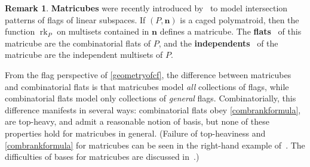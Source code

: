 \documentclass[11pt]{article}
\theoremstyle{definition}
\newtheorem{rema}[theo]{Remark}
\numberwithin{equation}{section}
\DeclareMathOperator{\rk}{rk}
\newcommand{\word}[1]{\textbf{#1}}
\begin{document}
\begin{rema}
  \label{matricube}
  \word{Matricubes} were recently introduced by~\cite{AG24} to model intersection patterns of flags of linear subspaces.
  If $(P, \mathbf n)$ is a caged polymatroid, then the function $\rk_P$ on multisets contained in $\mathbf n$ defines a matricube.
  The \word{flats}~\cite[Definition 3.1]{AG24} of this matricube are the combinatorial flats of $P$, and the \word{independents}~\cite[Definition~5.1]{AG24} of the matricube are the independent multisets of $P$.

  From the flag perspective of \cref{geometryofcf}, the difference between matricubes and combinatorial flats is that matricubes model \emph{all} collections of flags, while combinatorial flats model only collections of \emph{general} flags.
  Combinatorially, this difference manifests in several ways: combinatorial flats obey \cref{combrankformula}, are top-heavy, and admit a reasonable notion of basis, but none of these properties hold for matricubes in general. (Failure of top-heaviness and \cref{combrankformula} for matricubes can be seen in the right-hand example of~\cite[Section 3.1]{AG24}. The difficulties of bases for matricubes are discussed in~\cite[Section 9.1]{AG24}.)
\end{rema}
\end{document}
